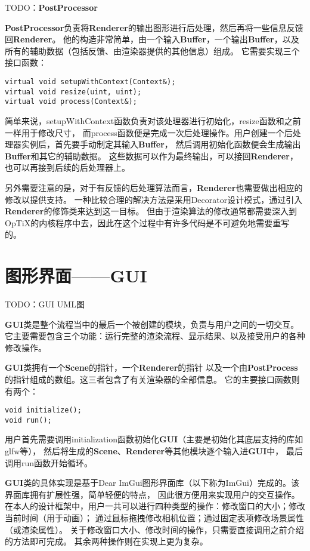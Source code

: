 TODO：\textbf{PostProcessor}

\textbf{PostProcessor}负责将\textbf{Renderer}的输出图形进行后处理，然后再将一些信息反馈回\textbf{Renderer}。
他的构造非常简单，由一个输入\textbf{Buffer}，一个输出\textbf{Buffer}，以及所有的辅助数据（包括反馈、由渲染器提供的其他信息）组成。
它需要实现三个接口函数：

\lstset{language=C++}
\begin{lstlisting}
virtual void setupWithContext(Context&);
virtual void resize(uint, uint);
virtual void process(Context&);
\end{lstlisting}

简单来说，setupWithContext函数负责对该处理器进行初始化，resize函数和之前一样用于修改尺寸，
而process函数便是完成一次后处理操作。用户创建一个后处理器实例后，首先要手动制定其输入\textbf{Buffer}，
然后调用初始化函数便会生成输出\textbf{Buffer}和其它的辅助数据。
这些数据可以作为最终输出，可以接回\textbf{Renderer}，也可以再接到后续的后处理器上。

另外需要注意的是，对于有反馈的后处理算法而言，\textbf{Renderer}也需要做出相应的修改以提供支持。
一种比较合理的解决方法是采用Decorator设计模式，通过引入\textbf{Renderer}的修饰类来达到这一目标。
但由于渲染算法的修改通常都需要深入到OpTiX的内核程序中去，因此在这个过程中有许多代码是不可避免地需要重写的。

\section{图形界面——GUI}

TODO：GUI UML图

\textbf{GUI}类是整个流程当中的最后一个被创建的模块，负责与用户之间的一切交互。
它主要需要包含三个功能：运行完整的渲染流程、显示结果、以及接受用户的各种修改操作。

\textbf{GUI}类拥有一个\textbf{Scene}的指针，一个\textbf{Renderer}的指针
以及一个由\textbf{PostProcess}的指针组成的数组。这三者包含了有关渲染器的全部信息。
它的主要接口函数则有两个：
\lstset{language=C++}
\begin{lstlisting}
void initialize();
void run();
\end{lstlisting}

用户首先需要调用initialization函数初始化\textbf{GUI}（主要是初始化其底层支持的库如glfw等），
然后将生成的\textbf{Scene}、\textbf{Renderer}等其他模块逐个输入进\textbf{GUI}中，
最后调用run函数开始循环。

\textbf{GUI}类的具体实现是基于Dear ImGui图形界面库\cite{Imgui}（以下称为ImGui）完成的。该界面库拥有扩展性强，简单轻便的特点，
因此很方便用来实现用户的交互操作。在本人的设计框架中，用户一共可以进行四种类型的操作：修改窗口的大小；修改当前时间（用于动画）；
通过鼠标拖拽修改相机位置；通过固定表项修改场景属性（或渲染属性）。
关于修改窗口大小、修改时间的操作，只需要直接调用之前介绍的方法即可完成。
其余两种操作则在实现上更为复杂。


